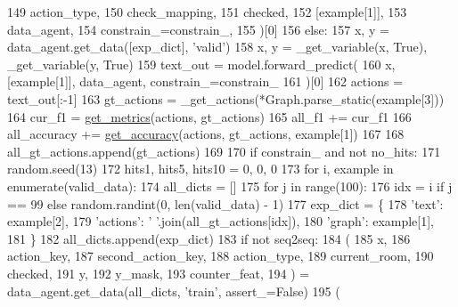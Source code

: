 \begin{DoxyCode}
149                 action\_type,
150                 check\_mapping,
151                 checked,
152                 [example[1]],
153                 data\_agent,
154                 constrain\_=constrain\_,
155             )[0]
156         \textcolor{keywordflow}{else}:
157             x, y = data\_agent.get\_data([exp\_dict], \textcolor{stringliteral}{'valid'})
158             x, y = \_get\_variable(x, \textcolor{keyword}{True}), \_get\_variable(y, \textcolor{keyword}{True})
159             text\_out = model.forward\_predict(
160                 x, [example[1]], data\_agent, constrain\_=constrain\_
161             )[0]
162         actions = text\_out[:-1]
163         gt\_actions = \_get\_actions(*Graph.parse\_static(example[3]))
164         cur\_f1 = \hyperlink{namespacegraph__world2_1_1train_ab3ba8ae63848a00ac638b31329041f6b}{get\_metrics}(actions, gt\_actions)
165         all\_f1 += cur\_f1
166         all\_accuracy += \hyperlink{namespacegraph__world2_1_1train_a8bb8c5ab11be91db36eb268e1c2088a8}{get\_accuracy}(actions, gt\_actions, example[1])
167 
168         all\_gt\_actions.append(gt\_actions)
169 
170     \textcolor{keywordflow}{if} constrain\_ \textcolor{keywordflow}{and} \textcolor{keywordflow}{not} no\_hits:
171         random.seed(13)
172         hits1, hits5, hits10 = 0, 0, 0
173         \textcolor{keywordflow}{for} i, example \textcolor{keywordflow}{in} enumerate(valid\_data):
174             all\_dicts = []
175             \textcolor{keywordflow}{for} j \textcolor{keywordflow}{in} range(100):
176                 idx = i \textcolor{keywordflow}{if} j == 99 \textcolor{keywordflow}{else} random.randint(0, len(valid\_data) - 1)
177                 exp\_dict = \{
178                     \textcolor{stringliteral}{'text'}: example[2],
179                     \textcolor{stringliteral}{'actions'}: \textcolor{stringliteral}{' '}.join(all\_gt\_actions[idx]),
180                     \textcolor{stringliteral}{'graph'}: example[1],
181                 \}
182                 all\_dicts.append(exp\_dict)
183             \textcolor{keywordflow}{if} \textcolor{keywordflow}{not} seq2seq:
184                 (
185                     x,
186                     action\_key,
187                     second\_action\_key,
188                     action\_type,
189                     current\_room,
190                     checked,
191                     y,
192                     y\_mask,
193                     counter\_feat,
194                 ) = data\_agent.get\_data(all\_dicts, \textcolor{stringliteral}{'train'}, assert\_=\textcolor{keyword}{False})
195                 (

\end{DoxyCode}
